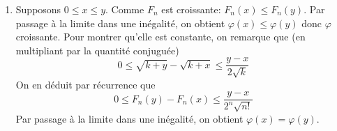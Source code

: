 \begin{enumerate}
\item Supposons $0\leq x \leq y$. Comme $F_n$ est croissante: $F_n(x)\leq F_n(y)$. Par passage à la limite dans une inégalité, on obtient $\varphi(x) \leq \varphi(y)$ donc $\varphi$ croissante. Pour montrer qu'elle est constante, on remarque que (en multipliant par la quantité conjuguée)
\begin{displaymath}
  0\leq \sqrt{k+y} - \sqrt{k+x} \leq \frac{y-x}{2\sqrt{k}}
\end{displaymath}
On en déduit par récurrence que
\begin{displaymath}
  0\leq F_n(y) - F_n(x) \leq \frac{y-x}{2^n\sqrt{n!}}
\end{displaymath}
Par passage à la limite dans une inégalité, on obtient  $\varphi(x) = \varphi(y)$.

\end{enumerate}